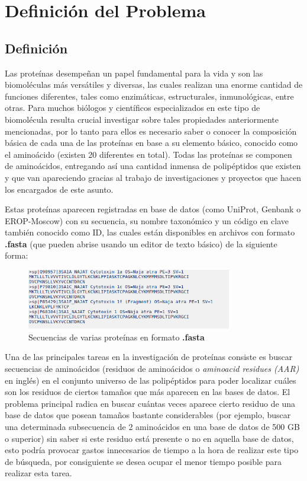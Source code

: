 \chapter{Definici\'on del Problema}

\section{Definición}

Las proteínas desempeñan un papel fundamental para la vida y son las biomoléculas más versátiles y diversas, las cuales realizan una enorme cantidad de funciones diferentes, tales como enzimáticas, estructurales, inmunológicas, entre otras. Para muchos biólogos y científicos especializados en este tipo de biomolécula resulta crucial investigar sobre tales propiedades anteriormente mencionadas, por lo tanto para ellos es necesario saber o conocer la composición básica de cada una de las proteínas en base a su elemento básico, conocido como el aminoácido (existen 20 diferentes en total). Todas las proteínas se componen de aminoácidos, entregando así una cantidad inmensa de polipéptidos que existen y que van apareciendo gracias al trabajo de investigaciones y proyectos que hacen los encargados de este asunto.

Estas proteínas aparecen registradas en base de datos (como UniProt, Genbank o EROP-Moscow) con su secuencia, su nombre taxonómico y un código en clave también conocido como ID, las cuales están disponibles en archivos con formato \textbf{.fasta} (que pueden abrise usando un editor de texto básico) de la siguiente forma:

\begin{figure}[ht]
    \centering
    \includegraphics[width=0.8\textwidth]{./images/secuencias.png}
    \caption{Secuencias de varias proteínas en formato \textbf{.fasta}}
    \label{fig:image4}
\end{figure}

Una de las principales tareas en la investigación de proteínas consiste es buscar secuencias de aminoácidos (residuos de aminoácidos o \textit{aminoacid residues (AAR)} en inglés) en el conjunto universo de las polipéptidos para poder localizar cuáles son los residuos de ciertos tamaños que más aparecen en las bases de datos. El problema principal radica en buscar cuántas veces aparece cierto residuo de una base de datos que posean tamaños bastante considerables (por ejemplo, buscar una determinada subsecuencia de 2 aminoácidos en una base de datos de 500 GB o superior) sin saber si este residuo está presente o no en aquella base de datos, esto podría provocar gastos innecesarios de tiempo a la hora de realizar este tipo de búsqueda, por consiguiente se desea ocupar el menor tiempo posible para realizar esta tarea.

